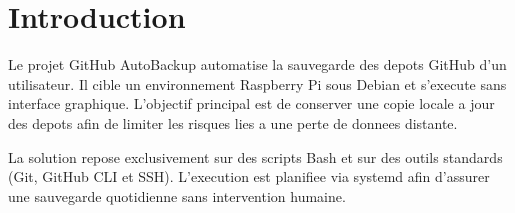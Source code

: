 \section{Introduction}
Le projet GitHub AutoBackup automatise la sauvegarde des depots GitHub d'un
utilisateur. Il cible un environnement Raspberry Pi sous Debian et s'execute sans
interface graphique. L'objectif principal est de conserver une copie locale a jour
des depots afin de limiter les risques lies a une perte de donnees distante.

La solution repose exclusivement sur des scripts Bash et sur des outils standards
(Git, GitHub CLI et SSH). L'execution est planifiee via systemd afin d'assurer une
sauvegarde quotidienne sans intervention humaine.
